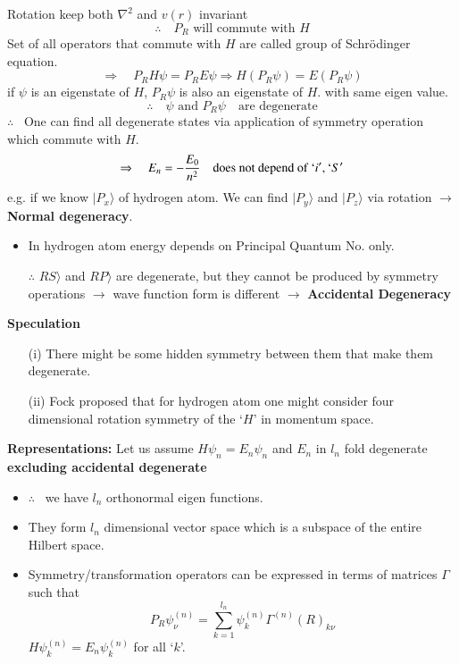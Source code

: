 Rotation keep both $\nabla^{2}$ and $v(r)$ invariant
$$
\therefore\quad P_{R}\text{ will commute with } H
$$
Set of all operators that commute with $H$ are called group of Schr\"odinger equation.
$$
\Rightarrow\quad P_{R}H\psi=P_{R}E\psi\Rightarrow H(P_{R}\psi)=E(P_{R}\psi)
$$
if $\psi$ is an eigenstate of $H$, $P_{R}\psi$ is also an eigenstate of $H$. with same eigen value.
$$
\therefore\quad \psi\text{ and } P_{R}\psi\quad\text{are degenerate}
$$
$\therefore$ \ One can find all degenerate states via application of symmetry operation which commute with $H$.
$$
\Rightarrow\quad E_{n}=-\dfrac{E_{0}}{n^{2}}\quad\text{does not depend of } `i', `S'
$$
e.g. if we know $|P_{x}\rangle$ of hydrogen atom. We can find $|P_{y}\rangle$ and $|P_{z}\rangle$ via rotation $\to$ {\bf Normal degeneracy}.
\begin{itemize}
\item In hydrogen atom energy depends on Principal Quantum No. only.

$\therefore$ $RS\rangle$ and $RP\rangle$ are degenerate, but they cannot be produced by symmetry operations $\to$ wave function form is different $\to$ {\bf Accidental Degeneracy}
\end{itemize}

\eject

\noindent
{\bf Speculation}
\begin{itemize}
\item[(i)] There might be some hidden symmetry between them that make them degenerate.

\item[(ii)] Fock proposed that for hydrogen atom one might consider four dimensional rotation symmetry of the `$H$' in momentum space.
\end{itemize}

\noindent
{\bf Representations:} Let us assume $H\psi_{n}=E_{n}\psi_{n}$ and $E_{n}$ in $l_{n}$ fold degenerate {\bf excluding accidental degenerate}
\begin{itemize}
\item $\therefore$ \ we have $l_{n}$ orthonormal eigen functions.

\item They form $l_{n}$ dimensional vector space which is a subspace of the entire Hilbert space.

\item Symmetry/transformation operators can be expressed in terms of matrices $\Gamma$ such that
$$
P_{R}\psi^{(n)}_{\nu}=\sum\limits^{l_{n}}_{k=1}\psi^{(n)}_{k}\Gamma^{(n)}(R)_{k\nu}
$$
$H\psi^{(n)}_{k}=E_{n}\psi^{(n)}_{k}$ for all `$k$'.
\end{itemize}

